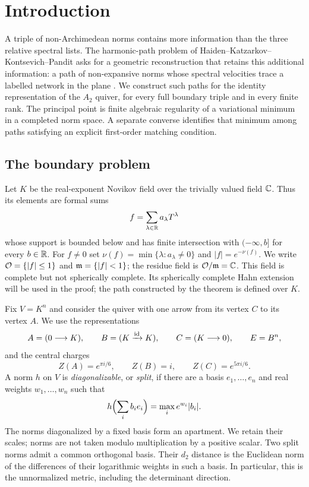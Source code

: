\section{Introduction}\label{sec:introduction}

A triple of non-Archimedean norms contains more information than the
three relative spectral lists. The harmonic-path problem of
Haiden--Katzarkov--Kontsevich--Pandit asks for a geometric reconstruction
that retains this additional information: a path of non-expansive norms
whose spectral velocities trace a labelled network in the plane
\cite[\S\S7.2--7.3]{HKKP26}. We construct such paths for the identity
representation of the $A_2$ quiver, for every full boundary triple and in
every finite rank. The principal point is finite algebraic regularity of
a variational minimum in a completed norm space. A separate converse
identifies that minimum among paths satisfying an explicit first-order
matching condition.

\subsection{The boundary problem}
Let $K$ be the real-exponent Novikov field over the trivially valued field
$\mathbb C$. Thus its elements are formal sums
\[
 f=\sum_{\lambda\in\mathbb R}a_\lambda T^\lambda
\]
whose support is bounded below and has finite intersection with
$(-\infty,b]$ for every $b\in\mathbb R$. For $f\ne0$ set
$\nu(f)=\min\{\lambda:a_\lambda\ne0\}$ and $|f|=e^{-\nu(f)}$.
We write $\mathcal O=\{|f|\le1\}$ and $\mathfrak m=\{|f|<1\}$; the residue field is
$\mathcal O/\mathfrak m=\mathbb C$. This field is complete but not spherically complete.
Its spherically complete Hahn extension will be used in the proof; the
path constructed by the theorem is defined over $K$.

Fix $V=K^n$ and consider the quiver with one arrow from its vertex $C$
to its vertex $A$. We use the representations
\begin{equation}\label{eq:ABC}
 A=(0\longrightarrow K),\qquad
 B=(K\xrightarrow{\operatorname{id}}K),\qquad
 C=(K\longrightarrow0),\qquad E=B^n,
\end{equation}
and the central charges
\begin{equation}\label{eq:charges}
 Z(A)=e^{\pi i/6},\qquad Z(B)=i,\qquad Z(C)=e^{5\pi i/6}.
\end{equation}
A norm $h$ on $V$ is \emph{diagonalizable}, or \emph{split}, if there are
a basis $e_1,\ldots,e_n$ and real weights $w_1,\ldots,w_n$ such that
\begin{equation}\label{eq:splitnorm}
 h\Bigl(\sum_i b_i e_i\Bigr)=\max_i e^{w_i}|b_i|.
\end{equation}
The norms diagonalized by a fixed basis form an apartment. We retain their
scales; norms are not taken modulo multiplication by a positive scalar.
Two split norms admit a common orthogonal basis. Their $d_2$ distance
is the Euclidean norm of the differences of their logarithmic weights
in such a basis. In particular, this is the unnormalized metric, including
the determinant direction.


